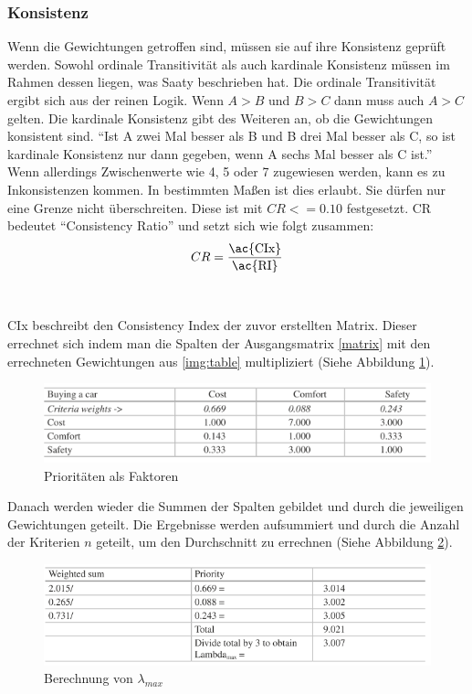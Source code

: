 \subsubsection{Konsistenz}
Wenn die Gewichtungen getroffen sind, müssen sie auf ihre Konsistenz geprüft werden.\autocite[Vgl.][S.13]{Mu.2018} Sowohl ordinale Transitivität als auch kardinale Konsistenz müssen im Rahmen dessen liegen, was Saaty beschrieben hat.\autocite[Vgl.][S.107]{Fink.2006} Die ordinale Transitivität ergibt sich aus der reinen Logik. Wenn $A > B$ und $B > C$ dann muss auch $A > C$ gelten.\autocite[Vgl.][S.108]{Fink.2006} Die kardinale Konsistenz gibt des Weiteren an, ob die Gewichtungen konsistent sind. \enquote{Ist A zwei Mal besser als B und B drei Mal besser als C, so ist kardinale Konsistenz nur dann gegeben, wenn A sechs Mal besser als C ist.}\autocite[S.107]{Fink.2006} Wenn allerdings Zwischenwerte wie 4, 5 oder 7 zugewiesen werden, kann es zu Inkonsistenzen kommen. In bestimmten Maßen ist dies erlaubt. Sie dürfen nur eine Grenze nicht überschreiten.\autocite[Vgl.][S.13]{Mu.2018} Diese ist mit $CR<=0.10$ festgesetzt. CR bedeutet \enquote{Consistency Ratio} und setzt sich wie folgt zusammen:\autocite[Vgl.][S.13]{Mu.2018}\\
\[CR=\frac{\mbox{\ac{CIx}}}{\mbox{\ac{RI}}}\]\\
\\
\ac{CIx} beschreibt den Consistency Index der zuvor erstellten Matrix. Dieser errechnet sich indem man die Spalten der Ausgangsmatrix \ref{matrix} mit den errechneten Gewichtungen aus \ref{img:table} multipliziert (Siehe Abbildung \ref{img:crit}).
\begin{figure}[h!]
	\centering
	\includegraphics[scale = 1]{img/Kriterien.png}
	\caption{Prioritäten als Faktoren}
	\label{img:crit}
\end{figure}
Danach werden wieder die Summen der Spalten gebildet und durch die jeweiligen Gewichtungen geteilt. Die Ergebnisse werden aufsummiert und durch die Anzahl der Kriterien $n$ geteilt, um den Durchschnitt zu errechnen (Siehe Abbildung \ref{img:lambda}). \\
\begin{figure}[h!]
	\centering
	\includegraphics[scale = 0.9]{img/Lambda.png}
	\caption{Berechnung von $\lambda_{max}$}
	\label{img:lambda}
\end{figure} 
